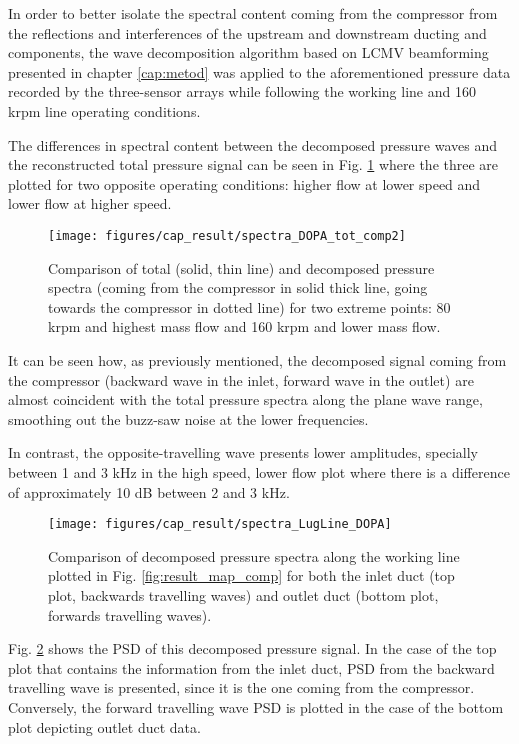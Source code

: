 In order to better isolate the spectral content coming from the compressor from the reflections and interferences of the upstream and downstream ducting and components, the wave decomposition algorithm based on LCMV beamforming presented in chapter \ref{cap:metod} was applied to the aforementioned pressure data recorded by the three-sensor arrays while following the working line and 160 krpm line operating conditions.

The differences in spectral content between the decomposed pressure waves and the reconstructed total pressure signal can be seen in Fig. \ref{fig:result_spectra_DOPA_tot_comp} where the three are plotted for two opposite operating conditions: higher flow at lower speed and lower flow at higher speed.

\begin{figure}[b!]
\centering
\texttt{[image: figures/cap\_result/spectra\_DOPA\_tot\_comp2]}
\caption{Comparison of total (solid, thin line) and decomposed pressure spectra (coming from the compressor in solid thick line, going towards the compressor in dotted line) for two extreme points: 80 krpm and highest mass flow and 160 krpm and lower mass flow.}
\label{fig:result_spectra_DOPA_tot_comp}
\end{figure}

It can be seen how, as previously mentioned, the decomposed signal coming from the compressor (backward wave in the inlet, forward wave in the outlet) are almost coincident with the total pressure spectra along the plane wave range, smoothing out the buzz-saw noise at the lower frequencies. 

In contrast, the opposite-travelling wave presents lower amplitudes, specially between 1 and 3 kHz in the high speed, lower flow plot where there is a difference of approximately 10 dB between 2 and 3 kHz.

\begin{figure}[tbh!]
\centering
\texttt{[image: figures/cap\_result/spectra\_LugLine\_DOPA]}
\caption{Comparison of decomposed pressure spectra along the working line plotted in Fig. \ref{fig:result_map_comp} for both the inlet duct (top plot, backwards travelling waves) and outlet duct (bottom plot, forwards travelling waves).}
\label{fig:result_spectra_LugLine_DOPA}
\end{figure}

Fig. \ref{fig:result_spectra_LugLine_DOPA} shows the PSD of this decomposed pressure signal. In the case of the top plot that contains the information from the inlet duct, PSD from the backward travelling wave is presented, since it is the one coming from the compressor. Conversely, the forward travelling wave PSD is plotted in the case of the bottom plot depicting outlet duct data.

